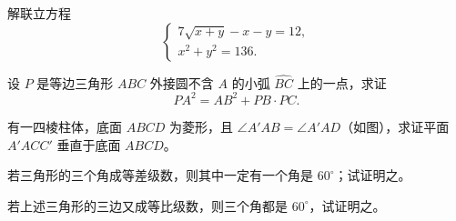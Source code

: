 \begin{question}
解联立方程
\nopagebreak[4]
\[
\begin{cases}
7\sqrt{x+y}-x-y=12,\\
x^2+y^2=136.
\end{cases}
\]

\end{question}
\begin{question}
设 $P$ 是等边三角形 $ABC$ 外接圆不含 $A$ 的小弧 $\widehat{BC}$ 上的一点，求证
\nopagebreak[4]
\[
PA^2=AB^2+PB\cdot PC.
\]

\Needspace{0.4\textheight}
\end{question}
\begin{question}
有一四棱柱体，底面 $ABCD$ 为菱形，且
$\angle A'AB=\angle A'AD$（如图），求证平面 $A'ACC'$ 垂直于底面 $ABCD$。
\nopagebreak[4]
\begin{center}\end{center}
\nopagebreak[4]
\end{question}
\begin{question}
若三角形的三个角成等差级数，则其中一定有一个角是 $60^\circ$；试证明之。

\end{question}
\begin{question}
若上述三角形的三边又成等比级数，则三个角都是 $60^\circ$，试证明之。

\end{question}